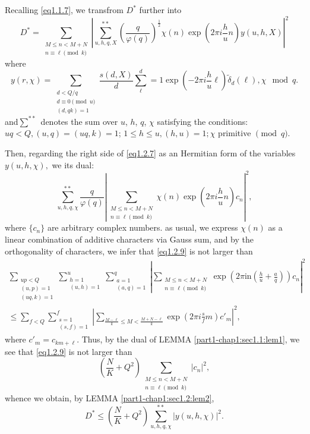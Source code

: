 Recalling \eqref{eq1.1.7}, we transfrom $D^*$ further into
\begin{equation*}
  D^*=\sum_{\substack{M\leq n< M+N\\ n\equiv \ell \pmod{k}}} |
  \sum^{**}_{u,h,q,X} \left(\frac{q}{\varphi
    (q)}\right)^{\frac{1}{2}}\chi(n)\exp\left(2
  \pi i \frac{h}{u}n\right) y(u,h,X)|^2 \tag{1.2.7} \label{eq1.2.7}
\end{equation*} 
where
\begin{equation*}
  y(r,\chi)= \sum_{\substack{d<Q/q\\ d\equiv 0 \pmod{u}\\ (d,qk)=1}}
  \frac{s(d,X)}{d}\sum^d_\ell=1 \exp\left(-2\pi i
  \frac{h}{u}\ell\right) \tilde{\delta}_d(\ell), \chi
  \mod{q}. \tag{1.2.8}  \label{eq1.2.8}
\end{equation*} 
 and\pageoriginale $\sum^{**}$ denotes the sum over $u$, $h$, $q$,
 $\chi$ satisfying 
 the conditions: $uq<Q,(u,q)= (uq, k)=1$; $1\leq h \leq
 u,(h,u)=1;\chi$ primitive $\pmod{q}$. 
 
 Then, regarding the right side of \eqref{eq1.2.7} as an
 Hermitian form of the variables $y(u,h,\chi),$ we its dual: 
 \begin{equation*}
   \sum^{**}_{u,h,q,\chi }\frac{q}{\varphi (q)}|\sum_{\substack{M\leq
       n<M+N \\ n\equiv \ell \pmod{k}}} \chi(n)\exp\left(2\pi i
   \frac{h}{u}n\right)c_n |^2,\tag{1.2.9}\label{eq1.2.9} 
 \end{equation*} 
 where $\{c_n\}$ are arbitrary complex numbers. as usual, we express
 $\chi(n)$ as a linear combination of additive characters via Gauss
 sum, and by the orthogonality of characters, we infer that
 \eqref{eq1.2.9} is not larger than 
\begin{multline*}
  \sum_{\substack {up<Q \\ (u,p)=1\\(uq,k)=1}}
  \sum^u_{\substack{h=1\\(u,h)=1}}
  \sum^q_{\substack{a=1\\(a,q)=1}}|
  \sum_{\substack{M\leq n<M+N\\ n\equiv \ell \pmod{k}}} \exp \left(2 \pi \text{in}
  \left(\frac{h}{u}+\frac{a}{q}\right)\right)c_n|^2 \\
  \leq \sum_{f<Q}
  \sum^f_{\substack{s=1\\(s,f)=1}}|\sum_{\frac{M-\ell}{k}\leq
    M<\frac{M+N-\ell}{k}} \exp \left(2\pi i \frac{s}{f}m\right) c'_m|^2, 
\end{multline*}
where $c'_m =c_{km+\ell}$. Thus, by the dual of LEMMA
\ref{part1-chap1:sec1.1:lem1}, we see 
that \eqref{eq1.2.9}  is not larger than 
$$
\left(\frac{N}{K}+Q^2\right)\sum_{\substack {M\leq n<M+N\\ n\equiv
    \ell \pmod{k}}} |c_n|^2, 
$$
whence we obtain, by LEMMA \ref{part1-chap1:sec1.2:lem2}, 
$$
 D^*\leq \left(\frac{N}{K}+Q^2\right) \sum^{**}_{u,h,q,\chi}|y(u,h,\chi)|^2.
 $$\pageoriginale
 
